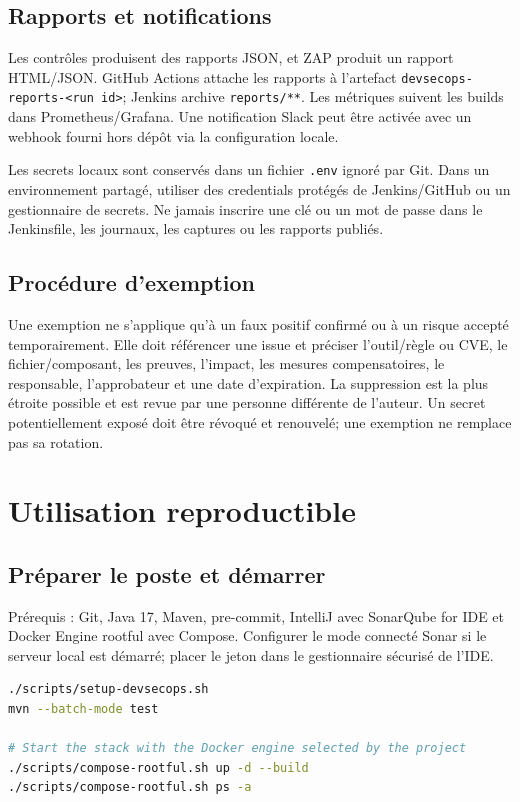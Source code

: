 \documentclass[11pt,a4paper,oneside]{report}
\begin{document}
\section{Rapports et notifications}
Les contrôles produisent des rapports JSON, et ZAP produit un rapport HTML/JSON. GitHub Actions attache les rapports à l'artefact \texttt{devsecops-reports-<run id>}; Jenkins archive \texttt{reports/**}. Les métriques suivent les builds dans Prometheus/Grafana. Une notification Slack peut être activée avec un webhook fourni hors dépôt via la configuration locale.

Les secrets locaux sont conservés dans un fichier \texttt{.env} ignoré par Git. Dans un environnement partagé, utiliser des credentials protégés de Jenkins/GitHub ou un gestionnaire de secrets. Ne jamais inscrire une clé ou un mot de passe dans le Jenkinsfile, les journaux, les captures ou les rapports publiés.

\section{Procédure d'exemption}
Une exemption ne s'applique qu'à un faux positif confirmé ou à un risque accepté temporairement. Elle doit référencer une issue et préciser l'outil/règle ou CVE, le fichier/composant, les preuves, l'impact, les mesures compensatoires, le responsable, l'approbateur et une date d'expiration. La suppression est la plus étroite possible et est revue par une personne différente de l'auteur. Un secret potentiellement exposé doit être révoqué et renouvelé; une exemption ne remplace pas sa rotation.

\chapter{Utilisation reproductible}

\section{Préparer le poste et démarrer}
Prérequis : Git, Java 17, Maven, pre-commit, IntelliJ avec SonarQube for IDE et Docker Engine rootful avec Compose. Configurer le mode connecté Sonar si le serveur local est démarré; placer le jeton dans le gestionnaire sécurisé de l'IDE.

\begin{lstlisting}[language=bash,caption={Installer les hooks et démarrer le laboratoire}]
./scripts/setup-devsecops.sh
mvn --batch-mode test

# Start the stack with the Docker engine selected by the project
./scripts/compose-rootful.sh up -d --build
./scripts/compose-rootful.sh ps -a
\end{lstlisting}
\end{document}
